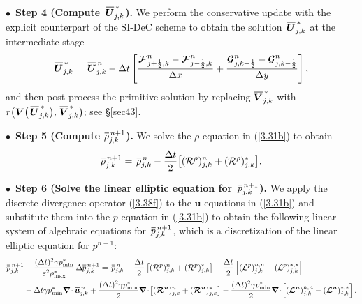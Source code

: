 \documentclass[preprint,12pt]{elsarticle}
\def\bnabla{\bm{\nabla}}
\newcommand{\dt}{\Delta t}
\newcommand{\dx}{\Delta x}
\newcommand{\dy}{\Delta y}
\newcommand{\kph}{{k+\frac{1}{2}}}
\newcommand{\kmh}{{k-\frac{1}{2}}}
\newcommand{\jph}{{j+\frac{1}{2}}}
\newcommand{\jmh}{{j-\frac{1}{2}}}
\newcommand{\ve}{\varepsilon}
\newcommand\eref[1]{(\ref{#1})}
\newcommand*\xbar[1]{%
	\hbox{%
		\vbox{%
			\hrule height 0.5pt %
			\kern0.4ex%
			\hbox{%
				\kern-0.05em%
				\ensuremath{#1}%
				\kern-0.00em%
			}%
		}%
	}%
}
\newcommand{\uvec}[2][3]{\boldsymbol{#2\mkern-#1mu}\mkern#1mu}
\begin{document}
\smallskip
\noindent
$\bullet\,$ \textbf{Step 4 (Compute $\,\xbar{\bm U}^{\,*}_{j,k}$).} 
We perform the conservative update with the explicit counterpart of the SI-DeC scheme to obtain the solution $\,\xbar{\bm U}^{\,*}_{j,k}$ 
at the intermediate stage
\begin{equation}
	\xbar{\bm U}^{\,*}_{j,k}=\,\xbar{\bm U}^{\,n}_{j,k}-\dt\left[\frac{\bm{{\cal F}}_{\jph,k}^n-\bm{{\cal F}}_{\jmh,k}^n}{\dx}+
	\frac{\bm{{\cal G}}_{j,\kph}^n-\bm{{\cal G}}_{j,\kmh}^n}{\dy}\right],
	\label{3.50}
\end{equation}
and then post-process the primitive solution by replacing $\xbar{\bm V}^{\,*}_{j,k}$ with
$r\big(\bm V\big(\,\xbar{\bm U}^{\,*}_{j,k}\big),\,\xbar{\bm V}^{\,*}_{j,k}\big)$; see \S\ref{sec43}.

\smallskip
\noindent
$\bullet\,$ \textbf{Step 5 (Compute $\xbar\rho^{\,n+1}_{j,k}$).} We solve the $\rho$-equation in \eref{3.31b} to obtain
\begin{equation*}
	\xbar\rho^{\,n+1}_{j,k}=\,\xbar\rho^{\,n}_{j,k}-\frac{\dt}{2}\big[({\cal R}^\rho)^n_{j,k}+({\cal R}^\rho)^*_{j,k}\big].
\end{equation*}

\smallskip
\noindent
$\bullet\,$ \textbf{Step 6 (Solve the linear elliptic equation for $\,\xbar p^{\,n+1}_{j,k}$).} We apply the discrete divergence operator
\eref{3.38f} to the $\bm u$-equations in \eref{3.31b} and substitute them into the $p$-equation in \eref{3.31b} to obtain the following
linear system of algebraic equations for $\,\xbar p^{\,n+1}_{j,k}$, which is a discretization of the linear elliptic equation for $p^{n+1}$:
\begin{equation*}
	\begin{aligned}
		\xbar p^{\,n+1}_{j,k}&-\frac{(\dt)^2\gamma p_{\min}^*}{\ve^2\rho_{\max}^*}\,\Delta\xbar p_{j,k}^{\,n+1}=\,\xbar p^{\,n}_{j,k}-
		\frac{\dt}{2}\left[({\cal R}^p)_{j,k}^n+({\cal R}^p)_{j,k}^*\right]-
		\frac{\dt}{2}\left[({\cal L}^p)^{n,n}_{j,k}-({\cal L}^p)^{*,*}_{j,k}\right]\\
		&-\dt\gamma p_{\min}^*\bnabla\!\cdot\xbar{\bm u}_{j,k}^{\,n}
		+\frac{(\dt)^2\gamma p_{\min}^*}{2}\bnabla\!\cdot\!\left[(\bm{{\cal R}}^{\bm u})^n_{j,k}+(\bm{{\cal R}}^{\bm u})^*_{j,k}\right]
		-\frac{(\dt)^2\gamma p_{\min}^*}{2}\bnabla\!\cdot\!\left[(\bm{{\cal L}}^{\uvec{u}})^{n,n}_{j,k}-(\bm{{\cal L}}^{\uvec{u}})^{*,*}_{j,k}\right].
	\end{aligned}
	\label{3.40f}
\end{equation*}
\end{document}
